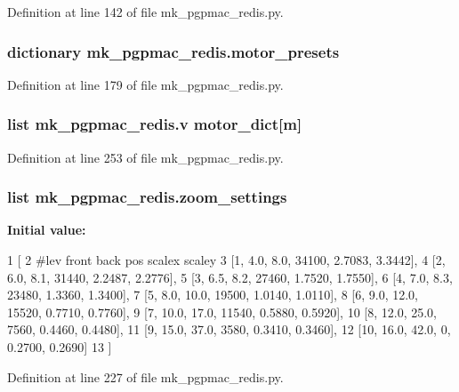 Definition at line 142 of file mk\-\_\-pgpmac\-\_\-redis.\-py.

\hypertarget{namespacemk__pgpmac__redis_a2a04d8d0b7270384d1fac674c29e774a}{
\subsubsection[{motor\-\_\-presets}]{\setlength{\rightskip}{0pt plus 5cm}dictionary mk\-\_\-pgpmac\-\_\-redis.\-motor\-\_\-presets}}\label{namespacemk__pgpmac__redis_a2a04d8d0b7270384d1fac674c29e774a}


Definition at line 179 of file mk\-\_\-pgpmac\-\_\-redis.\-py.

\hypertarget{namespacemk__pgpmac__redis_a5f3a2bd9ec25ae16b9b4af04dabb504c}{
\subsubsection[{v}]{\setlength{\rightskip}{0pt plus 5cm}list mk\-\_\-pgpmac\-\_\-redis.\-v {\bf motor\-\_\-dict}\mbox{[}m\mbox{]}}}\label{namespacemk__pgpmac__redis_a5f3a2bd9ec25ae16b9b4af04dabb504c}


Definition at line 253 of file mk\-\_\-pgpmac\-\_\-redis.\-py.

\hypertarget{namespacemk__pgpmac__redis_ad91bac9be746f99e1cf1f8e28ff348be}{
\subsubsection[{zoom\-\_\-settings}]{\setlength{\rightskip}{0pt plus 5cm}list mk\-\_\-pgpmac\-\_\-redis.\-zoom\-\_\-settings}}\label{namespacemk__pgpmac__redis_ad91bac9be746f99e1cf1f8e28ff348be}
{\bfseries Initial value\-:}
\begin{DoxyCode}
1 [
2     \textcolor{comment}{#lev   front  back  pos     scalex  scaley}
3     [1,     4.0,   8.0,  34100, 2.7083,  3.3442],
4     [2,     6.0,   8.1,  31440, 2.2487,  2.2776],
5     [3,     6.5,   8.2,  27460, 1.7520,  1.7550],
6     [4,     7.0,   8.3,  23480, 1.3360,  1.3400],
7     [5,     8.0,  10.0,  19500, 1.0140,  1.0110],
8     [6,     9.0,  12.0,  15520, 0.7710,  0.7760],
9     [7,    10.0,  17.0,  11540, 0.5880,  0.5920],
10     [8,    12.0,  25.0,   7560, 0.4460,  0.4480],
11     [9,    15.0,  37.0,   3580, 0.3410,  0.3460],
12     [10,   16.0,  42.0,      0, 0.2700,  0.2690]
13     ]
\end{DoxyCode}


Definition at line 227 of file mk\-\_\-pgpmac\-\_\-redis.\-py.

